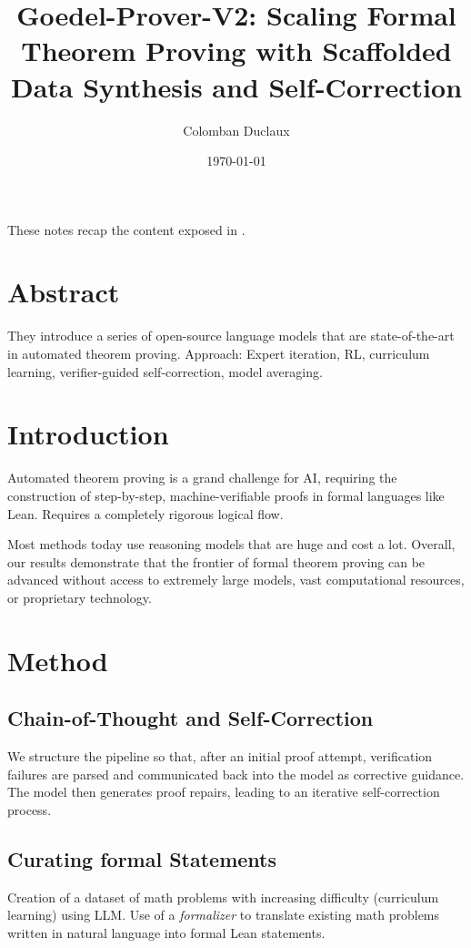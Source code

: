\documentclass{article}
\title{Goedel-Prover-V2: Scaling Formal Theorem Proving with Scaffolded Data Synthesis and Self-Correction}
\author{Colomban Duclaux}
\date{\today}
\begin{document}
\maketitle
These notes recap the content exposed in \cite{lin2025goedelproverv2scalingformaltheorem}.

\section{Abstract}
They introduce a series of open-source language models that are state-of-the-art in automated theorem proving.
Approach: Expert iteration, RL, curriculum learning, verifier-guided self-correction, model averaging.

\section{Introduction}
Automated theorem proving is a grand challenge for AI, requiring the construction of step-by-step, machine-verifiable proofs in formal languages like Lean. Requires a completely rigorous logical flow.

Most methods today use reasoning models that are huge and cost a lot. Overall, our results demonstrate that the frontier of formal theorem proving can be advanced without
access to extremely large models, vast computational resources, or proprietary technology.

\section{Method}
\subsection{Chain-of-Thought and Self-Correction}
We structure the pipeline so that, after an initial proof attempt, verification
failures are parsed and communicated back into the model as corrective guidance. The model then
generates proof repairs, leading to an iterative self-correction process.

\subsection{Curating formal Statements}
Creation of a dataset of math problems with increasing difficulty (curriculum learning) using LLM. Use of a \textit{formalizer} to translate existing math problems written in natural language into formal Lean statements.
\end{document}
